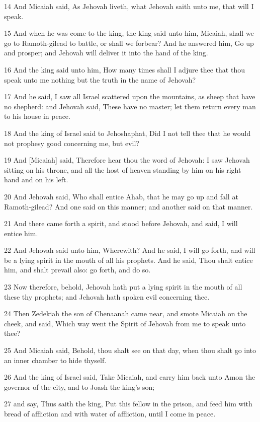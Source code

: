 \par 14 And Micaiah said, As Jehovah liveth, what Jehovah saith unto me, that will I speak.
\par 15 And when he was come to the king, the king said unto him, Micaiah, shall we go to Ramoth-gilead to battle, or shall we forbear? And he answered him, Go up and prosper; and Jehovah will deliver it into the hand of the king.
\par 16 And the king said unto him, How many times shall I adjure thee that thou speak unto me nothing but the truth in the name of Jehovah?
\par 17 And he said, I saw all Israel scattered upon the mountains, as sheep that have no shepherd: and Jehovah said, These have no master; let them return every man to his house in peace.
\par 18 And the king of Israel said to Jehoshaphat, Did I not tell thee that he would not prophesy good concerning me, but evil?
\par 19 And [Micaiah] said, Therefore hear thou the word of Jehovah: I saw Jehovah sitting on his throne, and all the host of heaven standing by him on his right hand and on his left.
\par 20 And Jehovah said, Who shall entice Ahab, that he may go up and fall at Ramoth-gilead? And one said on this manner; and another said on that manner.
\par 21 And there came forth a spirit, and stood before Jehovah, and said, I will entice him.
\par 22 And Jehovah said unto him, Wherewith? And he said, I will go forth, and will be a lying spirit in the mouth of all his prophets. And he said, Thou shalt entice him, and shalt prevail also: go forth, and do so.
\par 23 Now therefore, behold, Jehovah hath put a lying spirit in the mouth of all these thy prophets; and Jehovah hath spoken evil concerning thee.
\par 24 Then Zedekiah the son of Chenaanah came near, and smote Micaiah on the cheek, and said, Which way went the Spirit of Jehovah from me to speak unto thee?
\par 25 And Micaiah said, Behold, thou shalt see on that day, when thou shalt go into an inner chamber to hide thyself.
\par 26 And the king of Israel said, Take Micaiah, and carry him back unto Amon the governor of the city, and to Joash the king's son;
\par 27 and say, Thus saith the king, Put this fellow in the prison, and feed him with bread of affliction and with water of affliction, until I come in peace.
